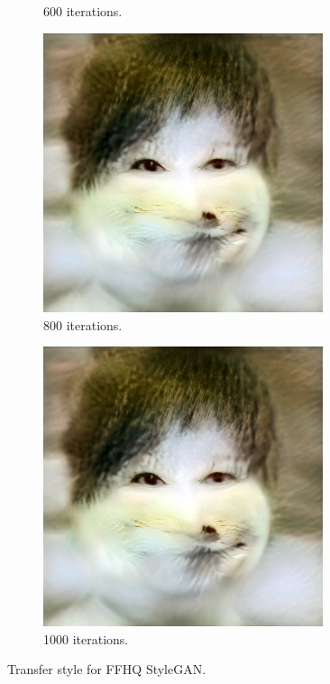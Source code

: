 \documentclass[conference]{IEEEtran}
\theoremstyle{definition}
\theoremstyle{remark}
\theoremstyle{remark}
\begin{document}
\begin{figure}
\begin{subfigure}[b]{0.15\textwidth}
    \caption{600 iterations.}
  \end{subfigure}
  \begin{subfigure}[b]{0.15\textwidth}
    \centering \includegraphics[width=0.9\textwidth]{figs/ffhq-4.png}
    \caption{800 iterations.}
  \end{subfigure}
  \begin{subfigure}[b]{0.15\textwidth}
    \centering \includegraphics[width=0.9\textwidth]{figs/ffhq-5.png}
    \caption{1000 iterations.}
  \end{subfigure}
  \caption{Transfer style for FFHQ StyleGAN.}
  \label{fig:stylegan-cat}
\end{figure}
\end{document}
